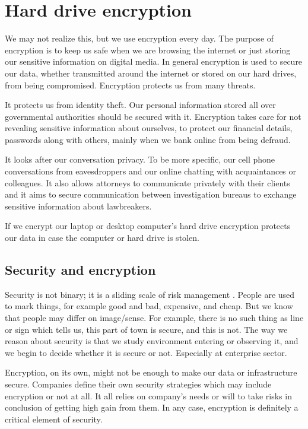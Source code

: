 \chapter{Hard drive encryption}\label{encryption}


We may not realize this, but we use encryption every day.
The purpose of encryption is to keep us safe when we are browsing the internet or just storing our sensitive information on digital media. 
In general encryption is used to secure our data, whether transmitted around the internet or stored on our hard drives, from being compromised.
Encryption protects us from many threats.

It protects us from identity theft. 
Our personal information stored all over governmental authorities should be secured with it.
Encryption takes care for not revealing sensitive information about ourselves, to protect our financial details, passwords along with others, mainly when we bank online from being defraud.

It looks after our conversation privacy. 
To be more specific, our cell phone conversations from eavesdroppers and our online chatting with acquaintances or colleagues. 
It also allows attorneys to communicate privately with their clients and it aims to secure communication between investigation bureaus to exchange sensitive information about lawbreakers.

If we encrypt our laptop or desktop computer's hard drive encryption protects our data in case the computer or hard drive is stolen.

\section{Security and encryption}

Security is not binary; it is a sliding scale of risk management \cite{devconf}.
People are used to mark things, for example good and bad, expensive, and cheap.
But we know that people may differ on image/sense.
For example, there is no such thing as line or sign which tells us, this part of town is secure, and this is not. 
The way we reason about security is that we study environment entering or observing it, and we begin to decide whether it is secure or not. 
Especially at enterprise sector. 

Encryption, on its own, might not be enough to make our data or infrastructure secure.
Companies define their own security strategies which may include encryption or not at all. 
It all relies on company's needs or will to take risks in conclusion of getting high gain from them.
In any case, encryption is definitely a critical element of security.

